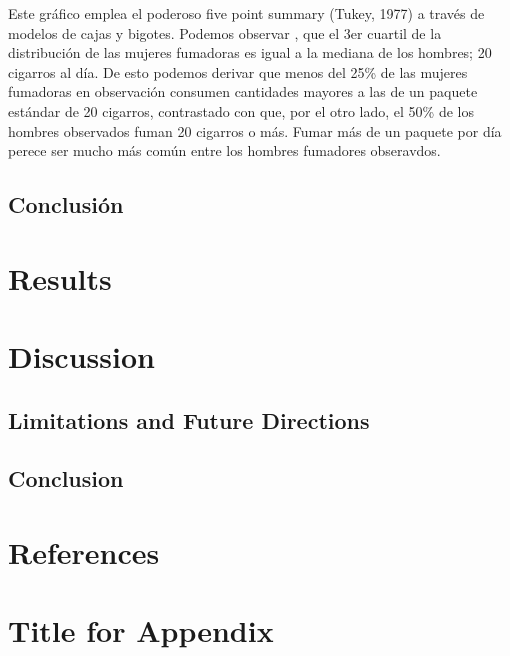 \documentclass[
  stu,
  longtable,
  nolmodern,
  notxfonts,
  notimes,
  colorlinks=true,linkcolor=blue,citecolor=blue,urlcolor=blue]{apa7}
\begin{document}
Este gráfico emplea el poderoso five point summary (Tukey, 1977) a
través de modelos de cajas y bigotes. Podemos observar , que el 3er
cuartil de la distribución de las mujeres fumadoras es igual a la
mediana de los hombres; 20 cigarros al día. De esto podemos derivar que
menos del 25\% de las mujeres fumadoras en observación consumen
cantidades mayores a las de un paquete estándar de 20 cigarros,
contrastado con que, por el otro lado, el 50\% de los hombres observados
fuman 20 cigarros o más. Fumar más de un paquete por día perece ser
mucho más común entre los hombres fumadores obseravdos.

\subsection{Conclusión}\label{conclusiuxf3n}

\section{Results}\label{results}

\section{Discussion}\label{discussion}

\subsection{Limitations and Future
Directions}\label{limitations-and-future-directions}

\subsection{Conclusion}\label{conclusion}

\section{References}\label{references}

\appendix

\section{Title for Appendix}\label{title-for-appendix}
\end{document}
